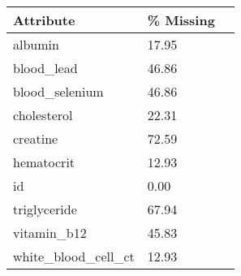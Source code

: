 \begin{tabular}{llr}
\toprule
\textbf{Attribute} &  \textbf{\% Missing} \\
\midrule
albumin &      17.95 \\
blood\_lead &      46.86 \\
blood\_selenium &      46.86 \\
cholesterol &      22.31 \\
creatine &      72.59 \\
hematocrit &      12.93 \\
id &       0.00 \\
triglyceride &      67.94 \\
vitamin\_b12 &      45.83 \\
white\_blood\_cell\_ct &      12.93 \\
\bottomrule
\end{tabular}
